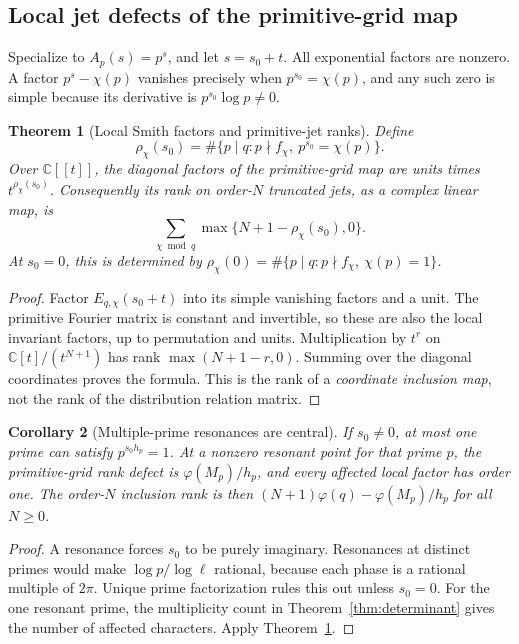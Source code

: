 \documentclass[11pt]{article}
\numberwithin{equation}{section}
\newtheorem{theorem}{Theorem}[section]
\newtheorem{corollary}[theorem]{Corollary}
\theoremstyle{definition}
\theoremstyle{remark}
\newcommand{\C}{\mathbb C}
\begin{document}
\subsection{Local jet defects of the primitive-grid map}
Specialize to $A_p(s)=p^s$, and let $s=s_0+t$. All exponential factors
are nonzero. A factor $p^s-\chi(p)$ vanishes precisely when
$p^{s_0}=\chi(p)$, and any such zero is simple because its derivative
is $p^{s_0}\log p\ne0$.

\begin{theorem}[Local Smith factors and primitive-jet ranks]\label{thm:smith}
Define
\begin{equation}\label{eq:rho-general}
 \rho_\chi(s_0)=\#\{p\mid q:p\nmid f_\chi,\ p^{s_0}=\chi(p)\}.
\end{equation}
Over $\C[[t]]$, the diagonal factors of the primitive-grid map are
units times $t^{\rho_\chi(s_0)}$. Consequently its rank on order-$N$
truncated jets, as a complex linear map, is
\begin{equation}\label{eq:primitive-jet-rank}
 \sum_{\chi\bmod q}\max\{N+1-\rho_\chi(s_0),0\}.
\end{equation}
At $s_0=0$, this is determined by
$\rho_\chi(0)=\#\{p\mid q:p\nmid f_\chi,\ \chi(p)=1\}$.
\end{theorem}
\begin{proof}
Factor $E_{q,\chi}(s_0+t)$ into its simple vanishing factors and a unit.
The primitive Fourier matrix is constant and invertible, so these are
also the local invariant factors, up to permutation and units.
Multiplication by $t^r$ on $\C[t]/(t^{N+1})$ has rank
$\max(N+1-r,0)$. Summing over the diagonal coordinates proves the
formula. This is the rank of a \emph{coordinate inclusion map}, not
the rank of the distribution relation matrix.
\end{proof}

\begin{corollary}[Multiple-prime resonances are central]\label{cor:central}
If $s_0\ne0$, at most one prime can satisfy
$p^{s_0h_p}=1$. At a nonzero resonant point for that prime $p$, the
primitive-grid rank defect is $\varphi(M_p)/h_p$, and every affected
local factor has order one. The order-$N$ inclusion rank is then
$(N+1)\varphi(q)-\varphi(M_p)/h_p$ for all $N\ge0$.
\end{corollary}
\begin{proof}
A resonance forces $s_0$ to be purely imaginary. Resonances at distinct
primes would make $\log p/\log\ell$ rational, because each phase is a
rational multiple of $2\pi$. Unique prime factorization rules this out
unless $s_0=0$. For the one resonant prime, the multiplicity count in
Theorem~\ref{thm:determinant} gives the number of affected characters.
Apply Theorem~\ref{thm:smith}.
\end{proof}
\end{document}
